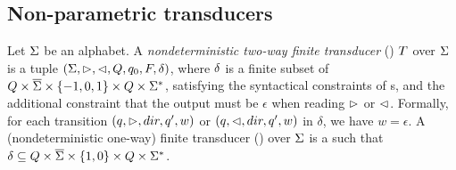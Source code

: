\subsection{Non-parametric transducers}
\begin{definition}
    Let $\Sigma$ be an alphabet. A \emph{nondeterministic two-way finite  transducer} (\FFT{}) $T$  over $\Sigma$ is a tuple $(\Sigma, \vartriangleright, \vartriangleleft, Q, q_0, F, \delta)$, where $\delta$ is  a finite subset of $Q \times \overline{\Sigma}\times \{-1, 0, 1\}\times 
    Q \times \Sigma^*$, satisfying the syntactical constraints of \FFA{}s, and the additional constraint that the output must be $\epsilon$ when reading $\vartriangleright$ or $\vartriangleleft$. Formally, for each transition $(q, \vartriangleright, dir, q', w)$ or $(q, \vartriangleleft, dir, q', w)$ in $\delta$, we have $w=\epsilon$.
%
%
%
A (nondeterministic one-way) finite transducer (\FT{}) over
    $\Sigma$ is a \FFT{} such that $\delta \subseteq Q \times \overline{\Sigma} \times
    \{1,0\} \times Q \times \Sigma^*$.
\end{definition}
